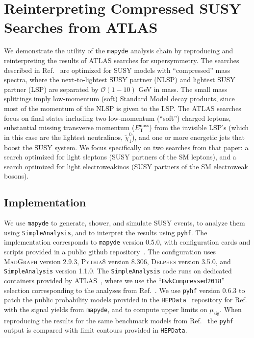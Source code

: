 \documentclass{article}
\newcommand{\chioz}{\ensuremath{\widetilde{\chi}_{1}^{0}}}
\newcommand{\met}{\ensuremath{E_{\mathrm{T}}^{\mathrm{miss}}}}
\newcommand{\mapyde}{\texttt{mapyde}}
\newcommand{\simpleanalysis}{\texttt{SimpleAnalysis}}
\newcommand{\madgraph}{\textsc{MadGraph}}
\newcommand{\pythia}{\textsc{Pythia8}}
\newcommand{\delphes}{\textsc{Delphes}}
\newcommand{\pyhf}{\texttt{pyhf}}
\newcommand{\musig}{\ensuremath{\mu_{\mathrm{sig}}}}
\newcommand{\hepdata}{\texttt{HEPData}}
\begin{document}
\section{Reinterpreting Compressed SUSY Searches from ATLAS}
\label{sec:reinterpreting-compressed-susy-searches-from-atlas}

We demonstrate the utility of the \mapyde{} analysis chain by reproducing and reinterpreting the results of ATLAS searches for supersymmetry.  The searches described in Ref.~\cite{ATLAS:2019lng} are optimized for SUSY models with \enquote{compressed} mass spectra, where the next-to-lightest SUSY partner (NLSP) and lightest SUSY partner (LSP) are separated by $\mathcal{O}(1-10)$ GeV in mass.  The small mass splittings imply low-momentum (soft) Standard Model decay products, since most of the momentum of the NLSP is given to the LSP.  The ATLAS searches focus on final states including two low-momentum (\enquote{soft}) charged leptons, substantial missing transverse momentum (\met) from the invisible LSP's (which in this case are the lightest neutralinos, \chioz), and one or more energetic jets that boost the SUSY system.  We focus specifically on two searches from that paper: a search optimized for light sleptons (SUSY partners of the SM leptons), and a search optimized for light electroweakinos (SUSY partners of the SM electroweak bosons).

\subsection{Implementation}
\label{ssec:implementation}

We use \mapyde{} to generate, shower, and simulate SUSY events, to analyze them using \simpleanalysis, and to interpret the results using \pyhf.  The implementation corresponds to \mapyde{} version 0.5.0, with configuration cards and scripts provided in a public github repository~\cite{mapyde-user}.  The configuration uses \madgraph{} version 2.9.3, \pythia{} version 8.306, \delphes{} version 3.5.0, and \simpleanalysis{} version 1.1.0.  The \simpleanalysis{} code runs on dedicated containers provided by ATLAS~\cite{SAGitLabRegistry}, where we use the \enquote{\texttt{EwkCompressed2018}} selection corresponding to the analyses from Ref.~\cite{ATLAS:2019lng}.  We use \pyhf{} version 0.6.3 to patch the public probability models provided in the \hepdata~\cite{HepData} repository for Ref.~\cite{ATLAS:2019lng} with the signal yields from \mapyde, and to compute upper limits on \musig.  When reproducing the results for the same benchmark models from Ref.~\cite{ATLAS:2019lng} the \pyhf{} output is compared with limit contours provided in \hepdata.
\end{document}
